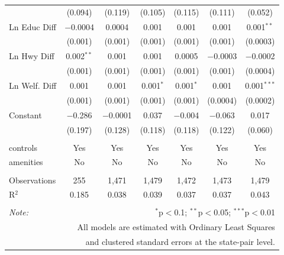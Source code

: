 \begin{table}[!htbp]
\begin{tabular}{@{\extracolsep{5pt}}lcccccc}
  & (0.094) & (0.119) & (0.105) & (0.115) & (0.111) & (0.052) \\ 
  Ln Educ Diff & $-$0.0004 & 0.0004 & 0.001 & 0.001 & 0.001 & 0.001$^{**}$ \\ 
  & (0.001) & (0.001) & (0.001) & (0.001) & (0.001) & (0.0003) \\ 
  Ln Hwy Diff & 0.002$^{**}$ & 0.001 & 0.001 & 0.0005 & $-$0.0003 & $-$0.0002 \\ 
  & (0.001) & (0.001) & (0.001) & (0.001) & (0.001) & (0.0004) \\ 
  Ln Welf. Diff & 0.001 & 0.001 & 0.001$^{*}$ & 0.001$^{*}$ & 0.001 & 0.001$^{***}$ \\ 
  & (0.001) & (0.001) & (0.001) & (0.001) & (0.0004) & (0.0002) \\ 
  Constant & $-$0.286 & $-$0.0001 & 0.037 & $-$0.004 & $-$0.063 & 0.017 \\ 
  & (0.197) & (0.128) & (0.118) & (0.118) & (0.122) & (0.060) \\ 
 \hline \\[-1.8ex] 
controls & Yes & Yes & Yes & Yes & Yes & Yes \\ 
amenities & No & No & No & No & No & No \\ 
\hline \\[-1.8ex] 
Observations & 255 & 1,471 & 1,479 & 1,472 & 1,473 & 1,479 \\ 
R$^{2}$ & 0.185 & 0.038 & 0.039 & 0.037 & 0.037 & 0.043 \\ 
\hline 
\hline \\[-1.8ex] 
\textit{Note:}  & \multicolumn{6}{r}{$^{*}$p$<$0.1; $^{**}$p$<$0.05; $^{***}$p$<$0.01} \\ 
 & \multicolumn{6}{r}{All models are estimated with Ordinary Least Squares} \\ 
 & \multicolumn{6}{r}{and clustered standard errors at the state-pair level.} \\ 
\end{tabular} 
\end{table} 
